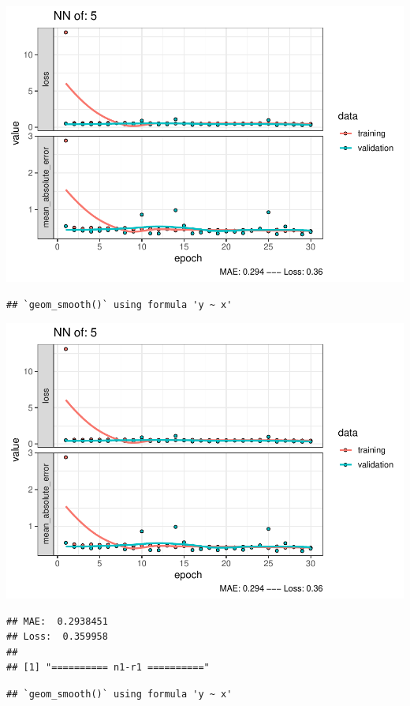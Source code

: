 \documentclass[
]{article}
\begin{document}
\includegraphics{project-code_files/figure-latex/unnamed-chunk-18-9.pdf}

\begin{verbatim}
## `geom_smooth()` using formula 'y ~ x'
\end{verbatim}

\includegraphics{project-code_files/figure-latex/unnamed-chunk-18-10.pdf}

\begin{verbatim}
## MAE:  0.2938451
## Loss:  0.359958 
## 
## [1] "========== n1-r1 =========="
\end{verbatim}

\begin{verbatim}
## `geom_smooth()` using formula 'y ~ x'
\end{verbatim}
\end{document}
